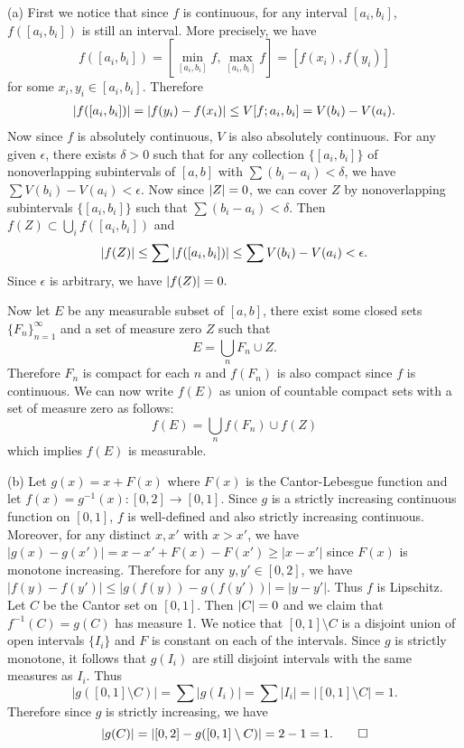  
 \begin{exercise}{7.10}
   (a) First we notice that since $f$ is continuous, for any interval $[a_i,b_i]$, $f([a_i,b_i])$ is still an interval. More precisely, we have
   \[
     f([a_i,b_i])=[\min_{[a_i,b_i]}f,\max_{[a_i,b_i]}f]=[f(x_i),f(y_i)]
   \]
   for some $x_i,y_i\in[a_i,b_i]$. Therefore
   \begin{align*}
       \left\vert f([a_i,b_i])\right\vert=\left\vert f(y_i)-f(x_i)\right\vert\leq V[f;a_i,b_i]=V(b_i)-V(a_i).
   \end{align*}
   Now since $f$ is absolutely continuous, $V$ is also absolutely continuous. For any given $\epsilon$, there exists $\delta>0$ such that for any collection $\{[a_i,b_i]\}$ of nonoverlapping subintervals of $[a,b]$ with $\sum(b_i-a_i)<\delta$, we have $\sum V(b_i)-V(a_i)<\epsilon.$ Now since $\left\vert Z\right\vert=0$, we can cover $Z$ by nonoverlapping subintervals $\{[a_i,b_i]\}$ such that $\sum(b_i-a_i)<\delta$. Then $f(Z)\subset\bigcup_i f([a_i,b_i])$ and 
   \[
     \left\vert f(Z)\right\vert\leq\sum\left\vert f([a_i,b_i])\right\vert\leq\sum V(b_i)-V(a_i)<\epsilon.
   \]
   Since $\epsilon$ is arbitrary, we have $\left\vert f(Z)\right\vert=0.$ 
   
   
   Now let $E$ be any measurable subset of $[a,b]$, there exist some closed sets  $\{F_n\}_{n=1}^\infty$ and a set of measure zero $Z$ such that 
   \[
     E=\bigcup_nF_n\cup Z.
   \]
   Therefore $F_n$ is compact for each $n$ and $f(F_n)$ is also compact since $f$ is continuous. We can now write $f(E)$ as union of countable compact sets with a set of measure zero as follows:
   \[
     f(E)=\bigcup_nf(F_n)\cup f(Z)
   \]
   which implies $f(E)$ is measurable.
   
   
   (b) Let $g(x)=x+F(x)$ where $F(x)$ is the Cantor-Lebesgue function and let $f(x)=g^{-1}(x):[0,2]\rightarrow [0,1]$. Since $g$ is a strictly increasing continuous function on $[0,1]$, $f$ is well-defined and also strictly increasing continuous. Moreover, for any distinct $x,x'$ with $x>x'$, we have $|g(x)-g(x')|=x-x'+F(x)-F(x')\geq |x-x'|$ since $F(x)$ is monotone increasing. Therefore for any $y, y'\in[0,2]$, we have $|f(y)-f(y')|\leq |g(f(y))-g(f(y'))|=|y-y'|$. Thus $f$ is Lipschitz. Let $C$ be the Cantor set on $[0,1]$. Then $\left\vert C\right\vert=0$ and we claim that $f^{-1}(C)=g(C)$ has measure 1. We notice that $[0,1]\setminus C$ is a disjoint union of open intervals $\{I_i\}$ and $F$ is constant on each of the intervals. Since $g$ is strictly monotone, it follows that $g(I_i)$ are still disjoint intervals with the same measures as $I_i$. Thus 
   \[
     |g([0,1]\setminus C)|=\sum|g(I_i)|=\sum|I_i|=|[0,1]\setminus C|=1.
   \]
   Therefore since $g$ is strictly increasing, we have 
   \[
     |g(C)|=|[0,2]-g([0,1]\setminus C)|=2-1=1.
     \qedhere
   \]
 \end{exercise}
 
